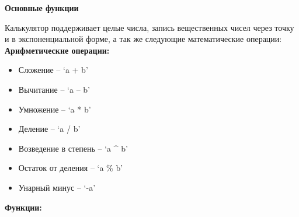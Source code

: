 \documentclass[]{article}
\begin{document}
\pagebreak[10]
\huge
\textbf{Основные функции}
\newline

\LARGE
Калькулятор поддерживает целые числа, запись вещественных чисел через точку и
в экспоненциальной форме, а так же следующие математические операции:
\newline
\textbf{Арифметические операции:}


\begin{itemize}
\item
  
  Сложение -- `a + b'
  
\item
  
  Вычитание -- `a -- b'
  
\item

  Умножение -- `a * b'

\item

  Деление -- `a / b'

\item

  Возведение в степень -- `a \^{} b'

\item

  Остаток от деления -- `a \% b'

\item

  Унарный минус -- `-a'

\end{itemize}


\textbf{Функции:}
\end{document}
